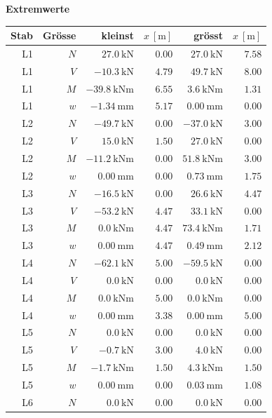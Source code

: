 \documentclass[11pt,a4paper]{article}
\begin{document}
\noindent\textbf{Extremwerte}
\begin{longtable}{rrrrrr}
\hline
Stab & Grösse & kleinst & $x\ [\mathrm{m}]$ & grösst & $x\ [\mathrm{m}]$ \\
\hline
\endhead
L1 & $N$ & $27.0\ \mathrm{kN}$ & $0.00$ & $27.0\ \mathrm{kN}$ & $7.58$ \\
L1 & $V$ & $-10.3\ \mathrm{kN}$ & $4.79$ & $49.7\ \mathrm{kN}$ & $8.00$ \\
L1 & $M$ & $-39.8\ \mathrm{kNm}$ & $6.55$ & $3.6\ \mathrm{kNm}$ & $1.31$ \\
L1 & $w$ & $-1.34\ \mathrm{mm}$ & $5.17$ & $0.00\ \mathrm{mm}$ & $0.00$ \\
L2 & $N$ & $-49.7\ \mathrm{kN}$ & $0.00$ & $-37.0\ \mathrm{kN}$ & $3.00$ \\
L2 & $V$ & $15.0\ \mathrm{kN}$ & $1.50$ & $27.0\ \mathrm{kN}$ & $0.00$ \\
L2 & $M$ & $-11.2\ \mathrm{kNm}$ & $0.00$ & $51.8\ \mathrm{kNm}$ & $3.00$ \\
L2 & $w$ & $0.00\ \mathrm{mm}$ & $0.00$ & $0.73\ \mathrm{mm}$ & $1.75$ \\
L3 & $N$ & $-16.5\ \mathrm{kN}$ & $0.00$ & $26.6\ \mathrm{kN}$ & $4.47$ \\
L3 & $V$ & $-53.2\ \mathrm{kN}$ & $4.47$ & $33.1\ \mathrm{kN}$ & $0.00$ \\
L3 & $M$ & $0.0\ \mathrm{kNm}$ & $4.47$ & $73.4\ \mathrm{kNm}$ & $1.71$ \\
L3 & $w$ & $0.00\ \mathrm{mm}$ & $4.47$ & $0.49\ \mathrm{mm}$ & $2.12$ \\
L4 & $N$ & $-62.1\ \mathrm{kN}$ & $5.00$ & $-59.5\ \mathrm{kN}$ & $0.00$ \\
L4 & $V$ & $0.0\ \mathrm{kN}$ & $0.00$ & $0.0\ \mathrm{kN}$ & $0.00$ \\
L4 & $M$ & $0.0\ \mathrm{kNm}$ & $5.00$ & $0.0\ \mathrm{kNm}$ & $0.00$ \\
L4 & $w$ & $0.00\ \mathrm{mm}$ & $3.38$ & $0.00\ \mathrm{mm}$ & $5.00$ \\
L5 & $N$ & $0.0\ \mathrm{kN}$ & $0.00$ & $0.0\ \mathrm{kN}$ & $0.00$ \\
L5 & $V$ & $-0.7\ \mathrm{kN}$ & $3.00$ & $4.0\ \mathrm{kN}$ & $0.00$ \\
L5 & $M$ & $-1.7\ \mathrm{kNm}$ & $1.50$ & $4.3\ \mathrm{kNm}$ & $1.50$ \\
L5 & $w$ & $0.00\ \mathrm{mm}$ & $0.00$ & $0.03\ \mathrm{mm}$ & $1.08$ \\
L6 & $N$ & $0.0\ \mathrm{kN}$ & $0.00$ & $0.0\ \mathrm{kN}$ & $0.00$ \\

\end{longtable}
\end{document}
